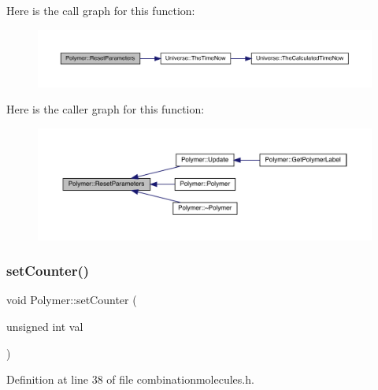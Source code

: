 Here is the call graph for this function\+:
\nopagebreak
\begin{figure}[H]
\begin{center}
\leavevmode
\includegraphics[width=350pt]{class_polymer_aa20f1e5c79e8631afa291569d5030103_cgraph}
\end{center}
\end{figure}
Here is the caller graph for this function\+:
\nopagebreak
\begin{figure}[H]
\begin{center}
\leavevmode
\includegraphics[width=350pt]{class_polymer_aa20f1e5c79e8631afa291569d5030103_icgraph}
\end{center}
\end{figure}
\mbox{\label{class_polymer_a7ed6bbe09a570b59f9253d63fd3326d2}} 
\subsubsection{\texorpdfstring{set\+Counter()}{setCounter()}\hspace{0.1cm}{\footnotesize\ttfamily [1/10]}}
{\footnotesize\ttfamily void Polymer\+::set\+Counter (\begin{DoxyParamCaption}\item[{unsigned int}]{val }\end{DoxyParamCaption})\hspace{0.3cm}{\ttfamily [inline]}}



Definition at line 38 of file combinationmolecules.\+h.

\mbox{\label{class_polymer_a7ed6bbe09a570b59f9253d63fd3326d2}} 
